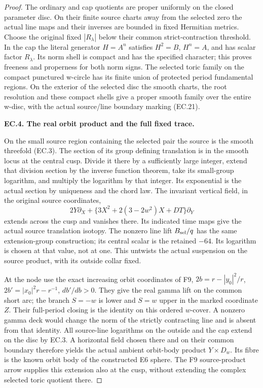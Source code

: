 \begin{proof}
The ordinary and cap quotients are proper uniformly on the closed
parameter disc. On their finite source charts away from the selected
zero the actual line maps and their inverses are bounded in fixed
Hermitian metrics. Choose the original fixed \(|R_\lambda|\) below
their common strict-contraction threshold. In the cap the literal
generator \(H=A^n\) satisfies \(H^2=B\), \(H^n=A\), and has scalar
factor \(R_\lambda\). Its norm shell is compact and has the
specified character; this proves freeness and properness for both
norm signs. The selected toric family on the compact punctured
w-circle has its finite union of protected period fundamental
regions. On the exterior of the selected disc the smooth charts,
the root resolution and these compact shells give a proper smooth
family over the entire w-disc, with the actual source/line boundary
marking (EC.21).

\par\medskip\noindent\textbf{EC.4. The real orbit product and the full fixed trace.}\par\nopagebreak[4]

On the small source region containing the selected pair the source
is the smooth threefold (EC.3). The section of its group defining
translation is in the smooth locus at the central cusp. Divide it
there by a sufficiently large integer, extend that division section
by the inverse function theorem, take its small-group logarithm,
and multiply the logarithm by that integer. Its exponential is the
actual section by uniqueness and the chord law. The invariant
vertical field, in the original source coordinates,
\[
 2Y\partial_X+\{3X^2+2(3-2w^2)X+DT\}\partial_Y
\]
extends across the cusp and vanishes there. Its indicated time maps
give the actual source translation isotopy. The nonzero line lift
\(B_{\rm sel}/q\) has the same extension-group construction; its
central scalar is the retained \(-64\). Its logarithm is chosen
at that value, not at one. This untwists the actual suspension on
the source product, with its outside collar fixed.

At the node use the exact increasing orbit coordinates of F9,
\(2b=r-|y_0|^2/r\), \(2b'=|x_0|^2r-r^{-1}\), \(db'/db>0\).
They give the real gamma lift on the common short arc; the branch
\(S=-w\) is lower and \(S=w\) upper in the marked coordinate
\(Z\). Their full-period closing is the identity on this ordered
\(w\)-cover. A nonzero gamma deck would change the norm of the
strictly contracting line and is absent from that identity.
All source-line logarithms on the outside and the cap extend on
the disc by EC.3. A horizontal field chosen there and on their
common boundary therefore yields the actual ambient orbit-body
product \(Y\times D_w\). Its fibre is the known orbit body of the
constructed E6 sphere. The F9 source-product arrow supplies this
extension also at the cusp, without extending the complex selected
toric quotient there.


\end{proof}

